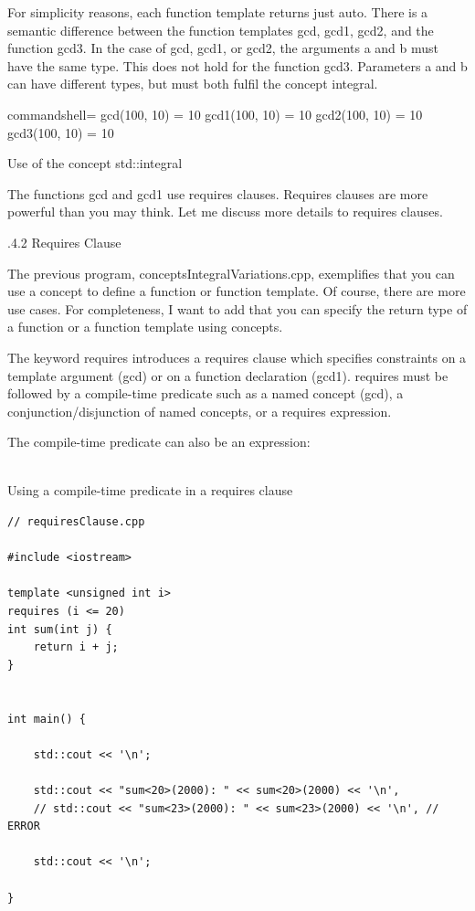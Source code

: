 For simplicity reasons, each function template returns just auto. There is a semantic difference between the function templates gcd, gcd1, gcd2, and the function gcd3. In the case of gcd, gcd1, or gcd2, the arguments a and b must have the same type. This does not hold for the function gcd3. Parameters a and b can have different types, but must both fulfil the concept integral.

\begin{tcblisting}{commandshell={}}
gcd(100, 10) = 10
gcd1(100, 10) = 10
gcd2(100, 10) = 10
gcd3(100, 10) = 10
\end{tcblisting}

\begin{center}
Use of the concept std::integral
\end{center}

The functions gcd and gcd1 use requires clauses. Requires clauses are more powerful than you may think. Let me discuss more details to requires clauses.

.4.2\hspace{0.2cm} Requires Clause

The previous program, conceptsIntegralVariations.cpp, exemplifies that you can use a concept to define a function or function template. Of course, there are more use cases. For completeness, I want to add that you can specify the return type of a function or a function template using concepts.

The keyword requires introduces a requires clause which specifies constraints on a template argument (gcd) or on a function declaration (gcd1). requires must be followed by a compile-time predicate such as a named concept (gcd), a conjunction/disjunction of named concepts, or a requires expression.

The compile-time predicate can also be an expression:

\hspace*{\fill} \\ %
\noindent
Using a compile-time predicate in a requires clause
\begin{lstlisting}[style=styleCXX]
// requiresClause.cpp

#include <iostream>

template <unsigned int i>
requires (i <= 20)
int sum(int j) {
	return i + j;
}


int main() {

	std::cout << '\n';
	
	std::cout << "sum<20>(2000): " << sum<20>(2000) << '\n',
	// std::cout << "sum<23>(2000): " << sum<23>(2000) << '\n', // ERROR
	
	std::cout << '\n';

}
\end{lstlisting}

